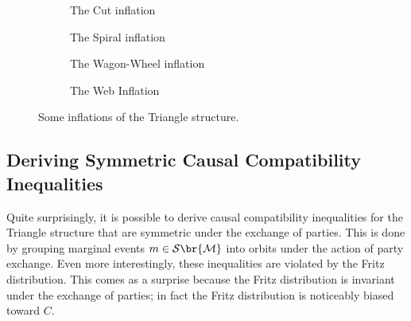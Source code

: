 \documentclass[aps, 10pt, english, twoside, pra, nofootinbib, tightenlines, longbibliography, superscriptaddress]{revtex4-1}
\renewcommand{\Events}[1]{\mathcal{S}\br{#1}} %
\begin{document}
    \begin{center}
    \begin{figure}
    \begin{subfigure}[b]{.45\linewidth}
    \scalebox{1}{}
    \caption{The Cut inflation}\label{fig:cut_inflation}
    \end{subfigure}
    \begin{subfigure}[b]{.45\linewidth}
    \scalebox{1}{}
    \caption{The Spiral inflation}\label{fig:spiral_inflation}
    \end{subfigure}

    \begin{subfigure}[b]{.45\linewidth}
    \scalebox{1.0}{}
    \caption{The Wagon-Wheel inflation}\label{fig:wagon_wheel_inflation}
    \end{subfigure}
    \begin{subfigure}[b]{.45\linewidth}
    \scalebox{1}{}
    \caption{The Web Inflation}\label{fig:the_web_inflation}
    \end{subfigure}
    \caption{Some inflations of the Triangle structure.}
    \label{fig:inflations}
    \end{figure}
    \end{center}

    \subsection{Deriving Symmetric Causal Compatibility Inequalities}
    \label{sec:symmetric_inequalities}

    Quite surprisingly, it is possible to derive causal compatibility inequalities for the Triangle structure that are symmetric under the exchange of parties. This is done by grouping marginal events $m \in \Events{\mscenario}$ into orbits under the action of party exchange. Even more interestingly, these inequalities are violated by the Fritz distribution. This comes as a surprise because the Fritz distribution is  invariant under the exchange of parties; in fact the Fritz distribution is noticeably biased toward $C$.
\end{document}
